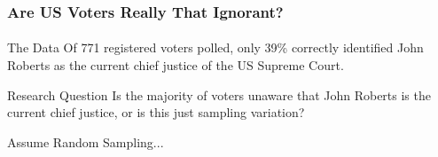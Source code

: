 %
%
\begin{frame}
\frametitle{Are US Voters Really That Ignorant?}
\framesubtitle{}

\begin{block}{The Data}
Of 771 registered voters polled, only 39\% correctly identified John Roberts as the current chief justice of the US Supreme Court.
\end{block}

\begin{block}{Research Question}
Is the majority of voters unaware that John Roberts is the current chief justice, or is this just sampling variation?
\end{block}

\alert{Assume Random Sampling...}

\end{frame}
